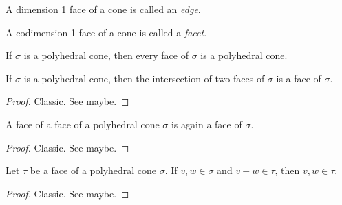 \begin{definition}
  \label{1-2-5-edge}

  A dimension 1 face of a cone is called an \emph{edge}.
\end{definition}


\begin{definition}
  \label{1-2-5-facet}

  A codimension 1 face of a cone is called a \emph{facet}.
\end{definition}


\begin{lemma}
  \label{1-2-6-face-polyhedral-cone}

  If $\sigma$ is a polyhedral cone, then every face of $\sigma$ is a polyhedral cone.
\end{lemma}


\begin{lemma}
  \label{1-2-6-inter-faces}

  If $\sigma$ is a polyhedral cone, then the intersection of two faces of $\sigma$ is a face of $\sigma$.
\end{lemma}
\begin{proof}
  \uses{}

  Classic. See \cite{Oda_1988} maybe.
\end{proof}


\begin{lemma}
  \label{1-2-6-face-face}

  A face of a face of a polyhedral cone $\sigma$ is again a face of $\sigma$.
\end{lemma}
\begin{proof}
  \uses{}

  Classic. See \cite{Oda_1988} maybe.
\end{proof}


\begin{lemma}
  \label{1-2-7-face-mem-of-add}

  Let $\tau$ be a face of a polyhedral cone $\sigma$. If $v, w \in \sigma$ and $v + w \in \tau$, then $v, w \in \tau$.
\end{lemma}
\begin{proof}
  \uses{}

  Classic. See \cite{Oda_1988} maybe.
\end{proof}


